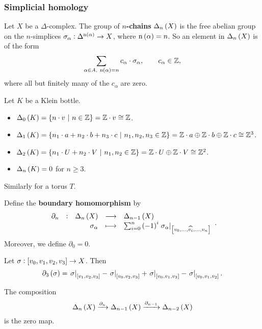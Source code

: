 \subsubsection{Simplicial homology}

Let $ X $ be a $ \Delta $-complex. The group of \textbf{$ n $-chains} $ \Delta_n\br{X} $ is the free abelian group on the $ n $-simplices $ \sigma_\alpha : \Delta^{\n\br{\alpha}} \to X $, where $ \n\br{\alpha} = n $. So an element in $ \Delta_n\br{X} $ is of the form
$$ \sum_{\alpha \in A, \ \n\br{\alpha} = n} c_\alpha \cdot \sigma_\alpha, \qquad c_\alpha \in \ZZ, $$
where all but finitely many of the $ c_\alpha $ are zero.

\begin{example*}
Let $ K $ be a Klein bottle.
\begin{itemize}
\item $ \Delta_0\br{K} = \cbr{n \cdot v \st n \in \ZZ} = \ZZ \cdot v \cong \ZZ $.
\item $ \Delta_1\br{K} = \cbr{n_1 \cdot a + n_2 \cdot b + n_3 \cdot c \st n_1, n_2, n_3 \in \ZZ} = \ZZ \cdot a \oplus \ZZ \cdot b \oplus \ZZ \cdot c \cong \ZZ^3 $.
\item $ \Delta_2\br{K} = \cbr{n_1 \cdot U + n_2 \cdot V \st n_1, n_2 \in \ZZ} = \ZZ \cdot U \oplus \ZZ \cdot V \cong \ZZ^2 $.
\item $ \Delta_n\br{K} = 0 $ for $ n \ge 3 $.
\end{itemize}
Similarly for a torus $ T $.
\end{example*}


Define the \textbf{boundary homomorphism} by
$$ \function[\partial_n]{\Delta_n\br{X}}{\Delta_{n - 1}\br{X}}{\sigma_\alpha}{\sum_{i = 0}^n \br{-1}^i\eval{\sigma_\alpha}_{\sbr{v_0, \dots, \widehat{v_i}, \dots, v_n}}}. $$
Moreover, we define $ \partial_0 = 0 $.

\begin{example*}
Let $ \sigma : \sbr{v_0, v_1, v_2, v_3} \to X $. Then
$$ \partial_3\br{\sigma} = \eval{\sigma}_{\sbr{v_1, v_2, v_3}} - \eval{\sigma}_{\sbr{v_0, v_2, v_3}} + \eval{\sigma}_{\sbr{v_0, v_1, v_3}} - \eval{\sigma}_{\sbr{v_0, v_1, v_2}}. $$
\end{example*}

\begin{lemma}
\label{lem:2.1}
The composition
$$ \Delta_n\br{X} \xrightarrow{\partial_n} \Delta_{n - 1}\br{X} \xrightarrow{\partial_{n - 1}} \Delta_{n - 2}\br{X} $$
is the zero map.
\end{lemma}

